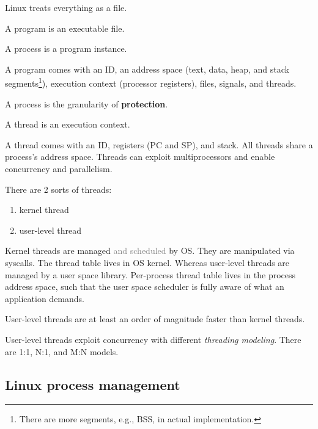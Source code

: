 
Linux treats everything as a file.

\begin{definition}[Program]
A program is an executable file.
\end{definition}

\begin{definition}[Process]
A process is a program instance.
\end{definition}

A program comes with an ID, an address space (text, data, heap, and stack segments\footnote{There are more segments, e.g., BSS, in actual implementation.}), execution context (processor registers), files, signals, and threads.

\begin{note}
A process is the granularity of \textbf{protection}.
\end{note}

\begin{definition}[Thread]
A thread is an execution context.
\end{definition}

A thread comes with an ID, registers (PC and SP), and stack. All threads share a process's address space. Threads can exploit multiprocessors and enable concurrency and parallelism.

There are 2 sorts of threads:

\begin{enumerate}
    \item kernel thread
    \item user-level thread
\end{enumerate}

Kernel threads are managed \textcolor{gray}{and scheduled} by OS. They are manipulated via syscalls. The thread table lives in OS kernel. Whereas user-level threads are managed by a user space library. Per-process thread table lives in the process address space, such that the user space scheduler is fully aware of what an application demands.

\begin{note}
User-level threads are at least an order of magnitude faster than kernel threads.
\end{note}

User-level threads exploit concurrency with different \textit{threading modeling}. There are 1:1, N:1, and M:N models.

\subsection{Linux process management}

